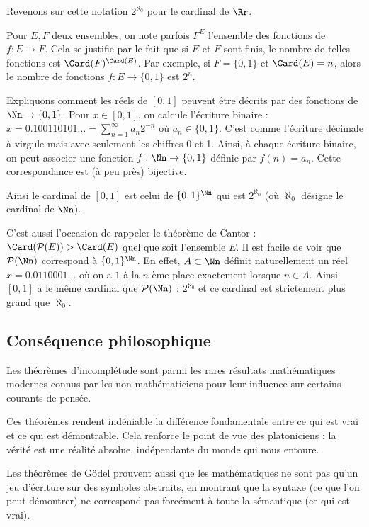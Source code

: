\documentclass[11pt,class=report,crop=false]{standalone}
\begin{document}
\bigskip

Revenons sur cette notation $2^{\aleph_0}$ pour le cardinal de $\Rr$.

Pour $E, F$ deux ensembles, on note parfois $F^E$ l'ensemble des fonctions de $f : E \to F$. Cela se justifie par le fait que si $E$ et $F$ sont finis, le nombre de telles fonctions est $\Card(F)^{\Card(E)}$.
Par exemple, si $F=\{0,1\}$ et $\Card(E)=n$, alors le nombre de fonctions $f: E \to \{0,1\}$ est $2^n$.

Expliquons comment les réels de $[0,1]$ peuvent être décrits par des fonctions de $\Nn \to \{0,1\}$.
Pour $x \in [0,1]$, on calcule l'écriture binaire : $x = 0.100110101\ldots =  \sum_{n=1}^\infty a_n 2^{-n}$ où $a_n \in \{0,1\}$.
C'est comme l'écriture décimale à virgule mais avec seulement les chiffres 0 et 1.
Ainsi, à chaque écriture binaire, on peut associer une fonction $f: \Nn \to \{0,1\}$ définie par $f(n) = a_n$.
Cette correspondance est (à peu près) bijective.

Ainsi le cardinal de $[0,1]$ est celui de $\{0,1\}^\Nn$ qui est $2^{\aleph_0}$ (où $\aleph_0$ désigne le cardinal de $\Nn$).

C'est aussi l'occasion de rappeler le théorème de Cantor : 
$\Card (\mathcal{P}(E)) > \Card(E)$ quel que soit l'ensemble $E$.
Il est facile de voir que $\mathcal{P}(\Nn)$ correspond à $\{0,1\}^\Nn$. En effet, $A \subset \Nn$ définit naturellement un réel $x=0.0110001\ldots$ où on a $1$ à la $n$-ème place exactement lorsque $n \in A$. Ainsi $[0,1]$ a le même cardinal que $\mathcal{P}(\Nn)$ : $2^{\aleph_0}$ et ce cardinal est strictement plus grand que $\aleph_0$.


\subsection{Conséquence philosophique}

Les théorèmes d'incomplétude sont parmi les rares résultats mathématiques modernes connus par les non-mathématiciens pour leur influence sur certains courants de pensée.

Ces théorèmes rendent indéniable la différence fondamentale entre ce qui est vrai et ce qui est démontrable. Cela renforce le point de vue des platoniciens : la vérité est une réalité absolue, indépendante du monde qui nous entoure.

Les théorèmes de Gödel prouvent aussi que les mathématiques ne sont pas qu'un jeu d'écriture sur des symboles abstraits, en montrant que la syntaxe (ce que l'on peut démontrer) ne correspond pas forcément à toute la sémantique (ce qui est vrai). 
\end{document}
